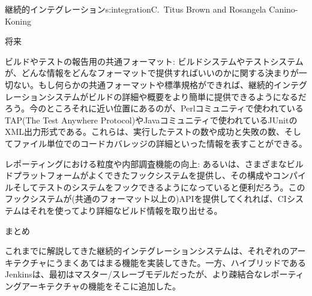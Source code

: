 \begin{aosachapter}{継続的インテグレーション}{s:integration}{C.\ Titus Brown and Rosangela Canino-Koning}
\begin{aosasect1}{将来}
\begin{aosadescription}
  \item{ビルドやテストの報告用の共通フォーマット:} ビルドシステムやテストシステムが、どんな情報をどんなフォーマットで提供すればいいのかに関する決まりが一切ない。もし何らかの共通フォーマットや標準規格ができれば、継続的インテグレーションシステムがビルドの詳細や概要をより簡単に提供できるようになるだろう。今のところそれに近い位置にあるのが、Perlコミュニティで使われているTAP(The Test Anywhere Protocol)やJavaコミュニティで使われているJUnitのXML出力形式である。これらは、実行したテストの数や成功と失敗の数、そしてファイル単位でのコードカバレッジの詳細といった情報を表すことができる。

  \item{レポーティングにおける粒度や内部調査機能の向上:} あるいは、さまざまなビルドプラットフォームがよくできたフックシステムを提供し、その構成やコンパイルそしてテストのシステムをフックできるようになっていると便利だろう。このフックシステムが(共通のフォーマット以上の)APIを提供してくれれば、CIシステムはそれを使ってより詳細なビルド情報を取り出せる。

\end{aosadescription}

\begin{aosasect2}{まとめ}

これまでに解説してきた継続的インテグレーションシステムは、それぞれのアーキテクチャにうまくあてはまる機能を実装してきた。一方、ハイブリッドであるJenkinsは、最初はマスター/スレーブモデルだったが、より疎結合なレポーティングアーキテクチャの機能をそこに追加した。


\end{aosasect2}
\end{aosasect1}
\end{aosachapter}
